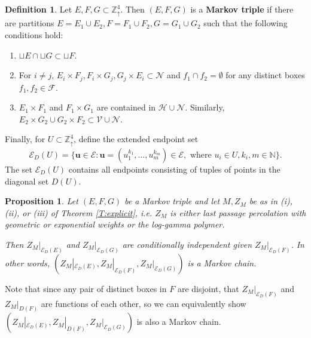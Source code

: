 \documentclass[aop, preprint]{imsart}
\theoremstyle{plain}
\newtheorem{prop}[theorem]{Proposition}%
\theoremstyle{definition}
\newtheorem{definition}[theorem]{Definition}
\theoremstyle{plain}
\newcommand{\N}{\mathbb{N}}
\newcommand{\sset}{\subset}
\newcommand{\scrE}{\mathcal{E}}
\newcommand{\Zd}{\mathds{Z}^4_\uparrow}
\newcommand{\scrV}{\mathcal{V}}
\newcommand{\scrH}{\mathcal{H}}
\newcommand{\scrN}{\mathcal{N}}
\newcommand{\scrF}{\mathcal{F}}
\newcommand{\X}{\times}
\newcommand{\bu}{\mathbf{u}}
\begin{document}
\begin{definition}
	\label{D:crossing-triple}
	Let $E, F, G \sset \Zd$. Then $(E, F, G)$ is a \textbf{Markov triple} if there are partitions $E = E_1 \cup E_2, F = F_1 \cup F_2, G = G_1 \cup G_2$ such that the following conditions hold:
	\begin{enumerate}[nosep, label=(\roman*)]
		\item $\sqcup E \cap \sqcup G \sset \sqcup F$.
		\item For $i \ne j$, $E_i \X F_j, F_i \X G_j, G_j \X E_i \sset \scrN$ and $f_1 \cap f_2 = \emptyset$ for any distinct boxes $f_1, f_2 \in \scrF$.
		\item $E_1 \X F_1$ and $F_1 \X G_1$ are contained in $\scrH \cup \scrN$. Similarly, $E_2 \X G_2 \cup G_2 \X F_2 \sset \scrV \cup \scrN$.
	\end{enumerate}
\end{definition}
Finally, for $U \sset \Zd$, define the extended endpoint set
\begin{equation*}
\scrE_D(U) = \{\bu \in \scrE: \bu = (u_1^{k_1}, \dots, u_m^{k_m}) \in \scrE, \text{ where } u_i \in U, k_i, m \in \N\}.
\end{equation*}
The set $\scrE_D(U)$ contains all endpoints consisting of tuples of points in the diagonal set $D(U)$.
\begin{prop}
	\label{P:1-step-markov}
	Let $(E, F, G)$ be a Markov triple and let $M, Z_M$ be as in (i), (ii), or (iii) of Theorem \ref{T:explicit}, i.e. $Z_M$ is either last passage percolation with geometric or exponential weights or the log-gamma polymer.
	 
	Then $Z_M|_{\scrE_D(E)}$ and $Z_M|_{\scrE_D(G)}$ are conditionally independent given $Z_M|_{\scrE_D(F)}$. In other words, $(Z_M|_{\scrE_D(E)}, Z_M|_{\scrE_D(F)}, Z_M|_{\scrE_D(G)})$ is a Markov chain.
\end{prop}

Note that since any pair of distinct boxes in $F$ are disjoint, that $Z_M|_{\scrE_D(F)}$ and $Z_M|_{D(F)}$ are functions of each other, so we can equivalently show $(Z_M|_{\scrE_D(E)}, Z_M|_{D(F)}, Z_M|_{\scrE_D(G)})$ is also a Markov chain.
\end{document}
